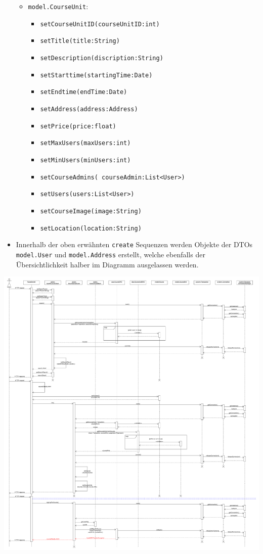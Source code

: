 \begin{itemize}
	\begin{itemize}
	\item \texttt{model.CourseUnit}:
		\begin{itemize}
		\item \texttt{setCourseUnitID(courseUnitID:int)}
		\item \texttt{setTitle(title:String)}
		\item \texttt{setDescription(discription:String)}
		\item \texttt{setStarttime(startingTime:Date)}
		\item \texttt{setEndtime(endTime:Date)}
		\item \texttt{setAddress(address:Address)}
		\item \texttt{setPrice(price:float)}
		\item \texttt{setMaxUsers(maxUsers:int)}
		\item \texttt{setMinUsers(minUsers:int)}
		\item \texttt{setCourseAdmins( courseAdmin:List<User>)}
		\item \texttt{setUsers(users:List<User>)}
		\item \texttt{setCourseImage(image:String)}
		\item \texttt{setLocation(location:String)}
		\end{itemize}
	\end{itemize}
	
\item Innerhalb der oben erwähnten \texttt{create} Sequenzen werden Objekte der DTOs \texttt{model.User} und \texttt{model.Address} erstellt, welche ebenfalls der Übersichtlichkeit halber im Diagramm ausgelassen werden.

\end{itemize}

\centering
\includegraphics[scale=0.205]{./Grafiken/Sequenzdiagramm-Kursanmeldung.pdf}



